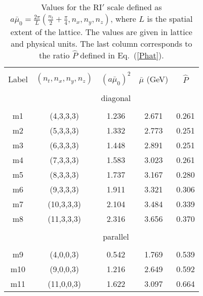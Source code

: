 \documentclass[12pt,tighten,nofootinbib,amssymb,floatfix]{article}
\begin{document}
{\small{
\begin{table}[!h]
\vspace*{-0.25cm}
\begin{center}
\begin{tabular}{ccccc}
\hline
\hline\\[-2ex]
Label & $(n_t,n_x,n_y,n_z)$   &  $(a \bar\mu_0)^2$ &  $\bar\mu$ (GeV)  &  $\hat{P}$  \\[0.5ex]
\hline
\hline\\[-2ex]
& & diagonal & & \\
\hline\\[-2ex]
 m1 &(4,3,3,3)		&1.236       &2.671	 &0.261  		\\
 m2 &(5,3,3,3)		&1.332       &2.773	 &0.251 		\\
 m3 &(6,3,3,3)		&1.448       &2.891	 &0.251		\\
 m4 &(7,3,3,3)		&1.583       &3.023	 &0.261 		\\
 m5 &(8,3,3,3)		&1.737       &3.167	 &0.280		\\
 m6 &(9,3,3,3)		&1.911        &3.321	 &0.306 		\\
 m7 &(10,3,3,3)	&2.104       &3.484 	 &0.339		\\
 m8 &(11,3,3,3)	&2.316       &3.656 	 &0.370 		\\[0.5ex]
 \hline\\[-2ex]
 & & parallel & & \\
 \hline\\[-2ex]
 m9 &(4,0,0,3)	&0.542       &1.769 	 &0.539 		\\
 m10 &(9,0,0,3)	&1.216       &2.649 	 &0.592 		\\
 m11 &(11,0,0,3)	&1.622       &3.097 	 &0.664 		\\[0.5ex]
\hline
\hline
\end{tabular}
\vspace*{-0.4cm}
\begin{center}
\begin{minipage}{14cm}
\hspace*{3cm}
\caption{\small{Values for the RI$'$ scale defined as $a \bar\mu_0{=}\frac{2\pi}{L} (\frac{n_t}{2} {+} \frac{\pi}{4}, n_x,n_y,n_z)$,
where $L$ is the spatial extent of the lattice. The values are given in lattice and physical units. 
The last column corresponds to the ratio $\hat{P}$ defined in Eq.~(\ref{Phat}).}}
\label{tab1}
\end{minipage}
\end{center}
\end{center}
\vspace*{-0.5cm}
\end{table}
}}
\end{document}
